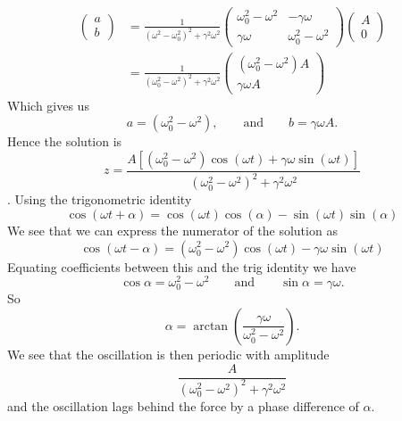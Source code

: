 \documentclass[a4paper]{article}
\begin{document}
    \begin{align*}
        \begin{pmatrix}
            a\\ b
        \end{pmatrix}
        &=
        \frac{1}{(\omega^2 - \omega_0^2)^2 + \gamma^2\omega^2}
        \begin{pmatrix}
            \omega_0^2 - \omega^2 & -\gamma\omega\\
            \gamma\omega & \omega_0^2 - \omega^2
        \end{pmatrix}
        \begin{pmatrix}
            A\\ 0
        \end{pmatrix}
        \\
        &= \frac{1}{(\omega_0^2 - \omega^2)^2 + \gamma^2\omega^2}
        \begin{pmatrix}
            (\omega_0^2 - \omega^2)A\\ \gamma\omega A
        \end{pmatrix}
    \end{align*}
    Which gives us
    \[a = (\omega_0^2 - \omega^2),\qquad\text{and}\qquad b = \gamma\omega A.\]
    Hence the solution is
    \[z = \frac{A[(\omega_0^2 - \omega^2)\cos(\omega t) + \gamma\omega\sin(\omega t)]}{(\omega_0^2 - \omega^2)^2 + \gamma^2\omega^2}\].
    Using the trigonometric identity
    \[\cos(\omega t + \alpha) = \cos(\omega t)\cos(\alpha) - \sin(\omega t)\sin(\alpha)\]
    We see that we can express the numerator of the solution as
    \[\cos(\omega t - \alpha) = (\omega_0^2 - \omega^2)\cos(\omega t) - \gamma\omega\sin(\omega t)\]
    Equating coefficients between this and the trig identity we have
    \[\cos\alpha = \omega_0^2 - \omega^2\qquad\text{and}\qquad \sin\alpha = \gamma\omega.\]
    So
    \[\alpha = \arctan\left(\frac{\gamma\omega}{\omega_0^2 - \omega^2}\right).\]
    We see that the oscillation is then periodic with amplitude
    \[\frac{A}{(\omega_0^2 - \omega^2)^2 + \gamma^2\omega^2}\]
    and the oscillation lags behind the force by a phase difference of \(\alpha\).
    
\end{document}

